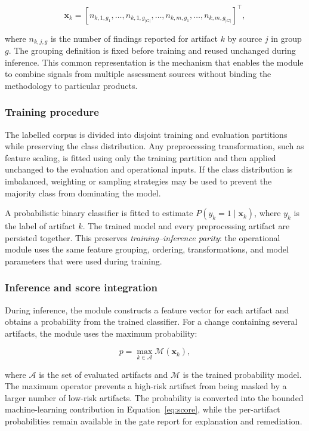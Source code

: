 \begin{equation}
\label{eq:ml-features-general}
\mathbf{x}_k =
\left[n_{k,1,g_1},\ldots,n_{k,1,g_{|G|}},\ldots,
n_{k,m,g_1},\ldots,n_{k,m,g_{|G|}}\right]^{\top},
\end{equation}

where $n_{k,j,g}$ is the number of findings reported for artifact $k$ by source $j$ in
group $g$. The grouping definition is fixed before training and reused unchanged during
inference. This common representation is the mechanism that enables the module to combine
signals from multiple assessment sources without binding the methodology to particular
products.

\subsubsection{Training procedure}
\label{subsubsec:rs-training}

The labelled corpus is divided into disjoint training and evaluation partitions while
preserving the class distribution. Any preprocessing transformation, such as feature
scaling, is fitted using only the training partition and then applied unchanged to the
evaluation and operational inputs. If the class distribution is imbalanced, weighting or
sampling strategies may be used to prevent the majority class from dominating the model.

A probabilistic binary classifier is fitted to estimate
$P(y_k=1\mid\mathbf{x}_k)$, where $y_k$ is the label of artifact $k$. The trained model
and every preprocessing artifact are persisted together. This preserves
\emph{training--inference parity}: the operational module uses the same feature grouping,
ordering, transformations, and model parameters that were used during training.

\subsubsection{Inference and score integration}

During inference, the module constructs a feature vector for each artifact and obtains a
probability from the trained classifier. For a change containing several artifacts, the
module uses the maximum probability:

\begin{equation}
\label{eq:ml}
p = \max_{k \in \mathcal{A}} \mathcal{M}(\mathbf{x}_k),
\end{equation}

where $\mathcal{A}$ is the set of evaluated artifacts and $\mathcal{M}$ is the trained
probability model. The maximum operator prevents a high-risk artifact from being masked
by a larger number of low-risk artifacts. The probability is converted into the bounded
machine-learning contribution in Equation~\ref{eq:score}, while the per-artifact
probabilities remain available in the gate report for explanation and remediation.

